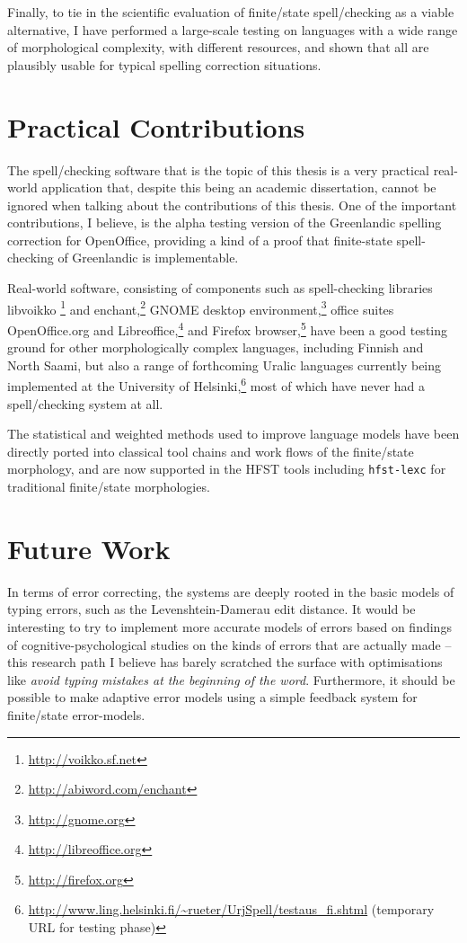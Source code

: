 \documentclass[officiallayout,final]{unihelcompling}
\begin{document}
Finally, to tie in the scientific evaluation of finite\-/state spell\-/checking
as a viable alternative, I have performed a large-scale testing on languages
with a wide range of morphological complexity, with different resources, and
shown that all are plausibly usable for typical spelling correction situations.


\section{Practical Contributions}
\label{sec:practical-contributions}

The spell\-/checking software that is the topic of this thesis is a very
practical real-world application that, despite this being an academic
dissertation, cannot be ignored when talking about the contributions of this
thesis. One of the important contributions, I believe, is the alpha testing
version of the Greenlandic spelling correction for OpenOffice, providing a kind
of a proof that finite-state spell-checking of Greenlandic is implementable.

Real-world software, consisting of components such as spell-checking libraries
libvoikko \footnote{\url{http://voikko.sf.net}} and
enchant,\footnote{\url{http://abiword.com/enchant}} GNOME desktop
environment,\footnote{\url{http://gnome.org}} office suites OpenOffice.org and
Libreoffice,\footnote{\url{http://libreoffice.org}} and Firefox
browser,\footnote{\url{http://firefox.org}} have been a good testing ground for
other morphologically complex languages, including Finnish and North Saami, but
also a range of forthcoming Uralic languages currently being implemented at
the University of
Helsinki,\footnote{\url{http://www.ling.helsinki.fi/~rueter/UrjSpell/testaus_fi.shtml}
(temporary URL for testing phase)} most of which have never had a
spell\-/checking system at all. 

The statistical and weighted methods used to improve language models have
been directly ported into classical tool chains and work flows of the 
finite\-/state morphology, and are now supported in the HFST tools including
\texttt{hfst-lexc} for traditional finite\-/state morphologies.

\section{Future Work}
\label{sec:future-work}

In terms of error correcting, the systems are deeply rooted in the basic models
of typing errors, such as the Levenshtein-Damerau edit distance. It would be
interesting to try to implement more accurate models of errors based on
findings of cognitive-psychological studies on the kinds of errors that are
actually made -- this research path I believe has barely scratched the surface
with optimisations like \emph{avoid typing mistakes at the beginning of the
word}. Furthermore, it should be possible to make adaptive error models using a
simple feedback system for finite\-/state error-models.
\end{document}
